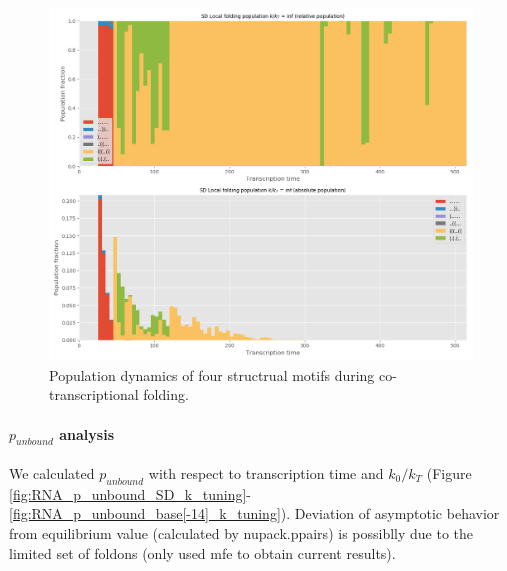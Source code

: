 \documentclass[11pt, a4paper]{article}
\begin{document}
\begin{figure}[tph]
\centering
\includegraphics[width=\textwidth]{RNA_local_population_evolution_summary}
\caption[Population dynamics]{\small Population dynamics of four structrual motifs during co-transcriptional folding.}
\label{fig:populations}
\end{figure}

\paragraph{$p_{unbound}$ analysis} We calculated $p_{unbound}$ with respect to transcription time and $k_0/k_T$ (Figure \ref{fig:RNA_p_unbound_SD_k_tuning}-\ref{fig:RNA_p_unbound_base[-14]_k_tuning}). Deviation of asymptotic behavior from equilibrium value (calculated by nupack.ppairs) is possiblly due to the limited set of foldons (only used mfe to obtain current results).
\end{document}
